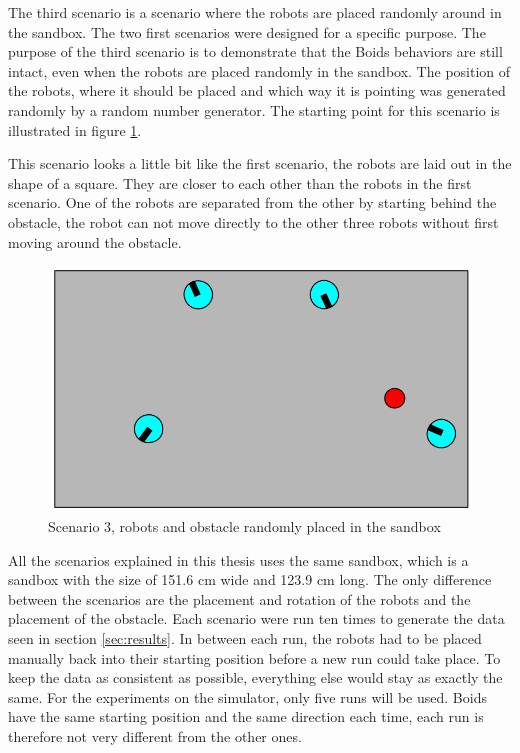 The third scenario is a scenario where the robots are placed randomly around in the sandbox. The two first scenarios were designed for a specific purpose. The purpose of the third scenario is to demonstrate that the Boids behaviors are still intact, even when the robots are placed randomly in the sandbox. The position of the robots, where it should be placed and which way it is pointing was generated randomly by a random number generator. The starting point for this scenario is illustrated in figure \ref{fig:scenario3}. 

This scenario looks a little bit like the first scenario, the robots are laid out in the shape of a square. They are closer to each other than the robots in the first scenario. One of the robots are separated from the other by starting behind the obstacle, the robot can not move directly to the other three robots without first moving around the obstacle.
\begin{figure}[h!]
\begin{center}
\includegraphics[width=0.8\linewidth]{figs/scenario2}
\end{center}
\caption[scenario 3]{Scenario 3, robots and obstacle randomly placed in the sandbox}
\label{fig:scenario3}
\end{figure}

All the scenarios explained in this thesis uses the same sandbox, which is a sandbox with the size of 151.6 cm wide and 123.9 cm long. The only difference between the scenarios are the placement and rotation of the robots and the placement of the obstacle. Each scenario were run ten times to generate the data seen in section \ref{sec:results}.
In between each run, the robots had to be placed manually back into their starting position before a new run could take place. To keep the data as consistent as possible, everything else would stay as exactly the same.
For the experiments on the simulator, only five runs will be used. Boids have the same starting position and the same direction each time, each run is therefore not very different from the other ones. 

